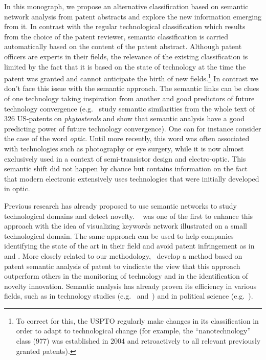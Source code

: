 \documentclass[12pt,twoside,a4paper]{article}
\begin{document}
In this monograph, we propose an alternative classification based on semantic network analysis from patent abstracts and explore the new information emerging from it. In contrast with the regular technological classification which results from the choice of the patent reviewer, semantic classification is carried automatically based on the content of the patent abstract. Although patent officers are experts in their fields, the relevance of the existing classification is limited by the fact that it is based on the state of technology at the time the patent was granted and cannot anticipate the birth of new fields.\footnote{To correct for this, the USPTO regularly make changes in its classification in order to adapt to technological change (for example, the ``nanotechnology'' class (977) was established in 2004 and  retroactively to all relevant previously granted patents).} In contrast we don't face this issue with the semantic approach. The semantic links can be clues of one technology taking inspiration from another and  good predictors of future technology convergence (e.g.~\cite{preschitschek2013} study semantic similarities from the whole text of 326 US-patents on \textit{phytosterols} and show that semantic analysis have a good predicting power of future technology convergence). One can for instance consider the case of the word \textit{optic}. Until more recently, this word was often associated with technologies such as photography or eye surgery, while it is now almost exclusively used in a context of semi-transistor design and electro-optic. This semantic shift did not happen by chance but contains information on the fact that modern electronic extensively uses technologies that were initially developed in optic. 

Previous research has already proposed to use semantic networks to study technological domains and detect novelty. ~\cite{yoon2004text} was one of the first to enhance this approach with the idea of visualizing keywords network illustrated on a small technological domain. The same approach can be used to help companies identifying the state of the art in their field and avoid patent infringement as in \cite{park2014semantic} and \cite{yoon2011detecting}. More closely related to our methodology,~\cite{gerken2012new} develop a method based on patent semantic analysis of patent to vindicate the view that this approach outperform others in the monitoring of technology and in the identification of novelty innovation. Semantic analysis has already proven its efficiency in various fields, such as in technology studies (e.g.~\cite{choi2014patent} and~\cite{fattori2003text}) and in political science (e.g.~\cite{2015arXiv151003797G}).
\end{document}
